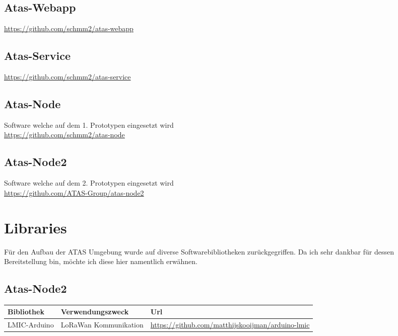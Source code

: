 \documentclass[11pt,english,german]{report}
\theoremstyle{definition}
\begin{document}
\subsection{Atas-Webapp}
\url{https://github.com/schmm2/atas-webapp}
\subsection{Atas-Service}
\url{https://github.com/schmm2/atas-service}
\subsection{Atas-Node}
Software welche auf dem 1. Prototypen eingesetzt wird\\
\url{https://github.com/schmm2/atas-node}
\subsection{Atas-Node2}
Software welche auf dem 2. Prototypen eingesetzt wird\\
\url{https://github.com/ATAS-Group/atas-node2}

\newpage
\section{Libraries}
Für den Aufbau der ATAS Umgebung wurde auf diverse Softwarebibliotheken zurückgegriffen. Da ich sehr dankbar für dessen Bereitstellung bin, möchte ich diese hier namentlich erwähnen.

\subsection{Atas-Node2}
\begin{tabularx}{\linewidth}{XXX}
	\textbf{Bibliothek} & \textbf{Verwendungszweck} & \textbf{Url} \\ \hline
	LMIC-Arduino & LoRaWan Kommunikation & \url{https://github.com/matthijskooijman/arduino-lmic}\\ \hline
\end{tabularx} 

\listoffigures
\end{document}

